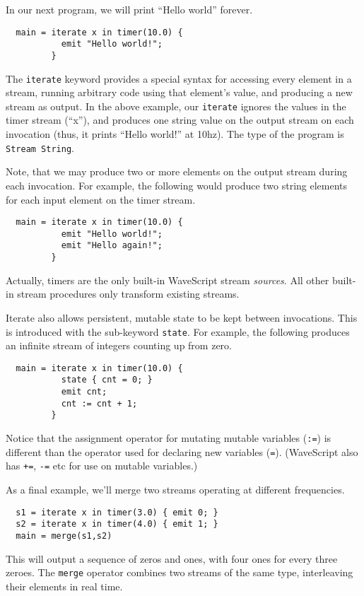\documentclass[twocolumn]{report}
\newcommand{\cde}{\tt}
\newcommand{\ws}{WaveScript}
\begin{document}
In our next program, we will print ``Hello world'' forever.
\begin{verbatim}
  main = iterate x in timer(10.0) {
           emit "Hello world!";
         }
\end{verbatim}
The {\cde iterate} keyword provides a special syntax for accessing
every element in a stream, running arbitrary code using that element's
value, and producing a new stream as output.  In the above example,
our {\cde iterate} ignores the values in the timer stream (``x''), and
produces one string value on the output stream on each invocation
(thus, it prints ``Hello world!'' at 10hz).  The type of the program
is {\tt Stream String}. 

Note, that we may produce two or more elements on the output stream
during each invocation.  For example, the following would produce two
string elements for each input element on the timer stream.
\begin{verbatim}
  main = iterate x in timer(10.0) {
           emit "Hello world!";
           emit "Hello again!";
         }
\end{verbatim}

Actually, timers are the only built-in {\ws} stream {\em sources}.
All other built-in stream procedures only transform existing streams.

Iterate also allows persistent, mutable state to be kept between
invocations.  This is introduced with the sub-keyword {\cde state}.
For example, the following produces an infinite stream of integers
counting up from zero.

\begin{verbatim}
  main = iterate x in timer(10.0) {
           state { cnt = 0; }
           emit cnt;
           cnt := cnt + 1;
         }
\end{verbatim}

Notice that the assignment operator for mutating mutable variables
({\cde :=}) is different than the operator used for declaring new
variables ({\cde =}).  ({\ws} also has {\cde +=}, {\cde -=} etc for use
on mutable variables.)

As a final example, we'll merge two streams operating at different
frequencies.

\begin{verbatim}
  s1 = iterate x in timer(3.0) { emit 0; }
  s2 = iterate x in timer(4.0) { emit 1; }
  main = merge(s1,s2)
\end{verbatim}

This will output a sequence of zeros and ones, with four ones for
every three zeroes.  The {\cde merge} operator combines two streams of
the same type, interleaving their elements in real time.
\end{document}
